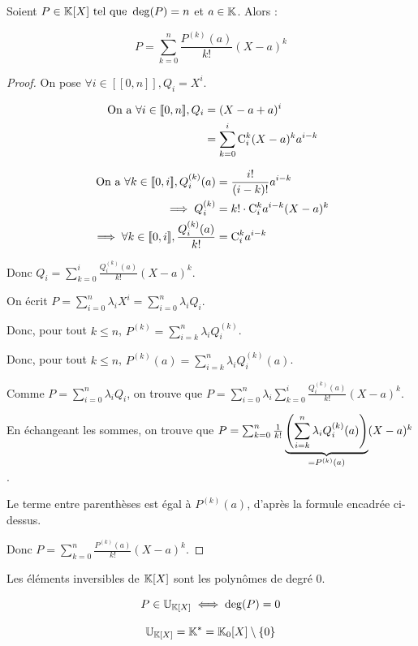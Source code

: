 \documentclass[12pt,a4paper]{report}
\begin{document}
\begin{theorem}
    Soient $P \in \mathbb{K}[X] \text{ tel que } \deg(P) = n$ et $a \in \mathbb{K}$. Alors :

    $$P = \sum_{k=0}^{n} \frac{P^{(k)}(a)}{k!} (X-a)^k$$
\end{theorem}

\begin{proof}
    On pose $\forall i \in [\![0,n]\!], Q_i = X^i$.

    \begin{align*}
        \text{ On a } \forall i \in [\![0,n]\!], Q_i &= (X-a+a)^i\\
        &= \sum_{k=0}^{i} \mathrm{C}_{i}^{k} (X-a)^k a^{i-k}
    \end{align*}

    \begin{align*}
        \text{ On a } \forall k \in [\![0,i]\!], Q_i^{(k)}(a) &= \frac{i!}{(i-k)!} a^{i-k}\\
        \implies Q_i^{(k)} &= k! \cdot \mathrm{C}_{i}^{k} a^{i-k} (X-a)^k\\
        \implies \forall k \in [\![0,i]\!], \frac{Q_i^{(k)}(a)}{k!} &= \mathrm{C}_{i}^{k} a^{i-k}\\
    \end{align*}

    Donc $Q_i = \sum_{k=0}^{i} \frac{Q_i^{(k)}(a)}{k!} (X-a)^k$.

    On écrit $P = \sum_{i=0}^{n} \lambda_i X^i = \sum_{i=0}^{n} \lambda_i Q_i$.

    Donc, pour tout $k\le n$, $P^{(k)} = \sum_{i=k}^n \lambda_i Q_i^{(k)}$.

    Donc, pour tout $k \le n$, $\boxed{P^{(k)}(a) = \sum_{i=k}^n \lambda_i Q_i^{(k)}(a)}$.
    
    Comme $P = \sum_{i=0}^{n}\lambda_i Q_i$, on trouve que $P = \sum_{i=0}^{n} \lambda_i \sum_{k=0}^{i} \frac{Q_i^{(k)}(a)}{k!} (X-a)^k$.

    En échangeant les sommes, on trouve que $P = \sum_{k=0}^{n} \frac{1}{k!} \underbrace{\left(\sum_{i=k}^{n} \lambda_i Q_i^{(k)}(a)\right)}_{=P^{(k)}(a)} (X-a)^k$.

    Le terme entre parenthèses est égal à $P^{(k)}(a)$, d'après la formule encadrée ci-dessus.

    Donc $P = \sum_{k=0}^{n} \frac{P^{(k)}(a)}{k!} (X-a)^k$.

\end{proof}

\begin{property}
    Les éléments inversibles de $\mathbb{K}[X]$ sont les polynômes de degré 0.

    $$P \in \mathbb{U}_{\mathbb{K}[X]} \iff \deg(P) = 0$$

    $$\mathbb{U}_{\mathbb{K}[X]} = \mathbb{K}^* = \mathbb{K}_0[X]\setminus\{0\}$$
\end{property}
\end{document}
